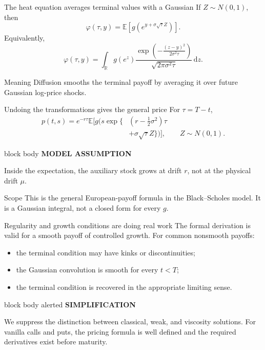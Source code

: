 \documentclass[handout,10pt,aspectratio=169]{beamer}
\newenvironment{modelbox}{%
  \begin{beamercolorbox}[rounded=true,sep=0.7em,wd=\textwidth]{block body}
  \textbf{\color{CourseBlue}MODEL ASSUMPTION}\quad
}{\end{beamercolorbox}}
\newenvironment{simplificationbox}{%
  \begin{beamercolorbox}[rounded=true,sep=0.7em,wd=\textwidth]{block body alerted}
  \textbf{\color{CourseRed}SIMPLIFICATION}\quad
}{\end{beamercolorbox}}
\newcommand{\dd}{\,\mathrm d}
\newcommand{\E}{\mathbb E}
\newcommand{\R}{\mathbb R}
\newcommand{\1}{\mathbf 1}
\begin{document}
\begin{frame}{The heat equation averages terminal values with a Gaussian}
If \(Z\sim N(0,1)\), then
\[
\boxed{
\varphi(\tau,y)
=\E\!\left[g\!\left(e^{y+\sigma\sqrt{\tau}Z}\right)\right].}
\]
Equivalently,
\[
\varphi(\tau,y)
=\int_{\R}g(e^z)
\frac{\exp\!\left(-\frac{(z-y)^2}{2\sigma^2\tau}\right)}
{\sqrt{2\pi\sigma^2\tau}}\dd z.
\]
\begin{block}{Meaning}
Diffusion smooths the terminal payoff by averaging it over future Gaussian
log-price shocks.
\end{block}
\end{frame}

\begin{frame}{Undoing the transformations gives the general price}
For \(\tau=T-t\),
\[
\boxed{
\begin{aligned}
p(t,s)
=e^{-r\tau}\E\Big[
g\Big(s\exp\{&(r-\tfrac12\sigma^2)\tau\\
&+\sigma\sqrt{\tau}Z\}\Big)
\Big],
\qquad Z\sim N(0,1).
\end{aligned}}
\]
\begin{modelbox}
Inside the expectation, the auxiliary stock grows at drift \(r\), not at the
physical drift \(\mu\).
\end{modelbox}
\begin{alertblock}{Scope}
This is the general European-payoff formula in the Black--Scholes model. It is
a Gaussian integral, not a closed form for every \(g\).
\end{alertblock}
\end{frame}

\begin{frame}{Regularity and growth conditions are doing real work}
The formal derivation is valid for a smooth payoff of controlled growth.
For common nonsmooth payoffs:
\begin{itemize}
  \item the terminal condition may have kinks or discontinuities;
  \item the Gaussian convolution is smooth for every \(t<T\);
  \item the terminal condition is recovered in the appropriate limiting sense.
\end{itemize}
\begin{simplificationbox}
We suppress the distinction between classical, weak, and viscosity solutions.
For vanilla calls and puts, the pricing formula is well defined and the
required derivatives exist before maturity.
\end{simplificationbox}
\end{frame}
\end{document}
